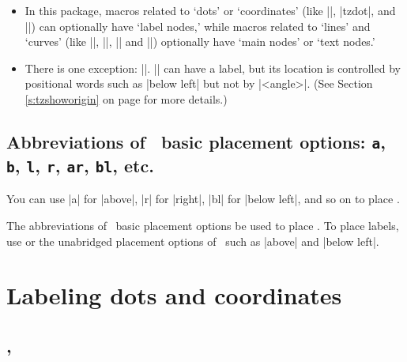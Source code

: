 \remark
\begin{itemize}
\item
In this package, macros related to `dots' or `coordinates' (like |\tzcdot|, |tzdot|, and |\tzcoor|) can optionally have `label nodes,' while macros related to `lines' and `curves' (like |\tzline|, |\tzto|, |\tzbezier| and |\tzparabola|) optionally have `main nodes' or `text nodes.'
\item
There is one exception: |\tzshoworigin|. |\tzshoworigin| can have a label, but its location is controlled by positional words such as |below left| but not by |<angle>|.
(See Section \ref{s:tzshoworigin} on page \pageref{s:tzshoworigin} for more details.)
\end{itemize}

\subsection{Abbreviations of \Tikz\ basic placement options: \texttt{a}, \texttt{b}, \texttt{l}, \texttt{r}, \texttt{ar}, \texttt{bl}, etc.}
\label{ssi:abbreviations}

You can use  |a| for |above|, |r| for |right|, |bl| for |below left|, and so on to place .

\begin{tzcode}{.3}
\end{tzcode}

\warning The abbreviations of \Tikz\ basic placement options  be used to place .
To place labels, use  or the unabridged placement options of \Tikz\ such as |above| and |below left|.

\section{Labeling dots and coordinates}
\label{si:labelingdots}

\subsection{\protect\cmd{\tzdot}, \protect\cmd{\tzcdot}}
\label{ssi:labeling:tzdot}

